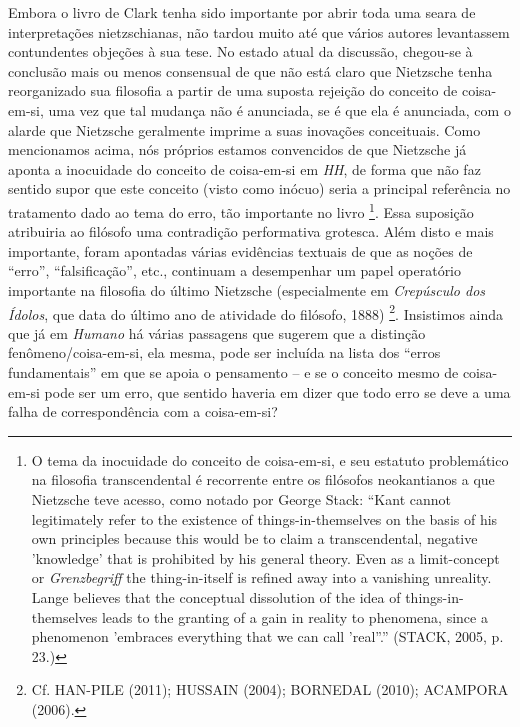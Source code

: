 \documentclass[
	12pt,				%
	openright,			%
	oneside,			%
	a4paper,			%
	english,			%
	french,				%
	spanish,			%
	brazil				%
	]{abntex2}
\begin{document}
Embora o livro de Clark tenha sido importante por abrir toda uma seara de interpretações nietzschianas, não tardou muito até que vários autores levantassem contundentes objeções à sua tese. No estado atual da discussão, chegou-se à conclusão mais ou menos consensual de que não está claro que Nietzsche tenha reorganizado sua filosofia a partir de uma suposta rejeição do conceito de coisa-em-si, uma vez que tal mudança não é anunciada, se é que ela é anunciada, com o alarde que Nietzsche geralmente imprime a suas inovações conceituais. Como mencionamos acima, nós próprios estamos convencidos de que Nietzsche já aponta a inocuidade do conceito de coisa-em-si em \textit{HH}, de forma que não faz sentido supor que este conceito (visto como inócuo) seria a principal referência no tratamento dado ao tema do erro, tão importante no livro
\footnote{O tema da inocuidade do conceito de coisa-em-si, e seu estatuto problemático na filosofia transcendental é recorrente entre os filósofos neokantianos a que Nietzsche teve acesso, como notado por George Stack: “Kant cannot legitimately refer to the existence of things-in-themselves on the basis of his own principles because this would be to claim a transcendental, negative 'knowledge' that is prohibited by his general theory. Even as a limit-concept or \textit{Grenzbegriff} the thing-in-itself is refined away into a vanishing unreality. Lange believes that the conceptual dissolution of the idea of things-in-themselves leads to the granting of a gain in reality to phenomena, since a phenomenon  'embraces everything that we can call 'real''.” (STACK, 2005, p. 23.)}. 
Essa suposição atribuiria ao filósofo uma contradição performativa grotesca. Além disto e mais importante, foram apontadas várias evidências textuais de que as noções de “erro”, “falsificação”, etc., continuam a desempenhar um papel operatório importante na filosofia do último Nietzsche (especialmente em \textit{Crepúsculo dos Ídolos}, que data do último ano de atividade do filósofo, 1888)
\footnote{Cf. HAN-PILE (2011); HUSSAIN (2004); BORNEDAL (2010); ACAMPORA (2006).}. 
Insistimos ainda que já em \textit{Humano} há várias passagens que sugerem que a distinção fenômeno/coisa-em-si, ela mesma, pode ser incluída na lista dos “erros fundamentais” em que se apoia o pensamento – e se o conceito mesmo de coisa-em-si pode ser um erro, que sentido haveria em dizer que todo erro se deve a uma falha de correspondência com a coisa-em-si?
\end{document}
